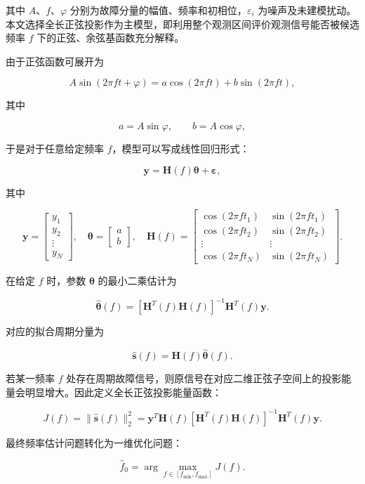 其中 \(A\)、\(f\)、\(\varphi\) 分别为故障分量的幅值、频率和初相位，\(\varepsilon_i\) 为噪声及未建模扰动。本文选择全长正弦投影作为主模型，即利用整个观测区间评价观测信号能否被候选频率 \(f\) 下的正弦、余弦基函数充分解释。


由于正弦函数可展开为


\[
A\sin(2\pi f t+\varphi)
=a\cos(2\pi f t)+b\sin(2\pi f t),
\]


其中


\[
a=A\sin\varphi,\qquad b=A\cos\varphi,
\]


于是对于任意给定频率 \(f\)，模型可以写成线性回归形式：


\[
\mathbf{y}=\mathbf{H}(f)\boldsymbol{\theta}+\boldsymbol{\varepsilon},
\]


其中


\[
\mathbf{y}=
\begin{bmatrix}
y_1\\y_2\\\vdots\\y_N
\end{bmatrix},
\quad
\boldsymbol{\theta}=
\begin{bmatrix}
a\\b
\end{bmatrix},
\quad
\mathbf{H}(f)=
\begin{bmatrix}
\cos(2\pi f t_1) & \sin(2\pi f t_1)\\
\cos(2\pi f t_2) & \sin(2\pi f t_2)\\
\vdots & \vdots\\
\cos(2\pi f t_N) & \sin(2\pi f t_N)
\end{bmatrix}.
\]


在给定 \(f\) 时，参数 \(\boldsymbol{\theta}\) 的最小二乘估计为


\[
\hat{\boldsymbol{\theta}}(f)
=
\left[\mathbf{H}^{T}(f)\mathbf{H}(f)\right]^{-1}
\mathbf{H}^{T}(f)\mathbf{y}.
\]


对应的拟合周期分量为


\[
\hat{\mathbf{s}}(f)=\mathbf{H}(f)\hat{\boldsymbol{\theta}}(f).
\]


若某一频率 \(f\) 处存在周期故障信号，则原信号在对应二维正弦子空间上的投影能量会明显增大。因此定义全长正弦投影能量函数：


\[
J(f)=\|\hat{\mathbf{s}}(f)\|_2^2
=
\mathbf{y}^{T}\mathbf{H}(f)
\left[\mathbf{H}^{T}(f)\mathbf{H}(f)\right]^{-1}
\mathbf{H}^{T}(f)\mathbf{y}.
\]


最终频率估计问题转化为一维优化问题：


\[
\hat{f}_0=\arg\max_{f\in[f_{\min},f_{\max}]}J(f).
\]


